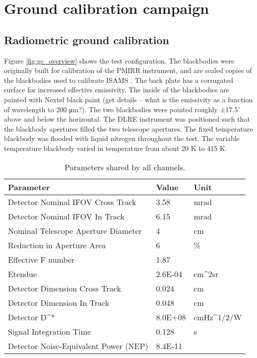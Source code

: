 \section{Ground calibration campaign}

\subsection{Radiometric ground calibration}
Figure \ref{fig:gc_overview} shows the test configuration.  The blackbodies were originally built for calibration of the PMIRR instrument, and are scaled copies of the blackbodies used to calibrate ISAMS \cite{Nightingale_1991}. The back plate has a corrugated surface for increased effective emissivity. The inside of the blackbodies are painted with Nextel black paint (get details – what is the emissivity as a function of wavelength to 200 μm?). The two blackbodies were pointed roughly ±17.5$^\circ$ above and below the horizontal.  The DLRE instrument was positioned such that the blackbody apertures filled the two telescope apertures.  The fixed temperature blackbody was flooded with liquid nitrogen throughout the test.  The variable temperature blackbody varied in temperature from about 20 K to 415 K.
\begin{table}
\begin{tabular}{lll}
Parameter & Value & Unit\\
\hline
Detector Nominal IFOV Cross Track & 3.58 & mrad \\
Detector Nominal IFOV In Track & 6.15 & mrad \\
Nominal Telescope Aperture Diameter & 4 & cm\\
Reduction in Aperture Area & 6 & \% \\
Effective F number & 1.87 & \\
Etendue & 2.6E-04 & cm^{2}sr \\
Detector Dimension Cross Track & 0.024 & cm \\
Detector Dimension In Track & 0.048 & cm \\
Detector D^* & 8.0E+08 & cmHz^{1/2}/W \\
Signal Integration Time & 0.128 & s \\
Detector Noise-Equivalent Power (NEP) & 8.4E-11 & \\
\hline
\end{tabular}
\caption{\label{tab:parameters_shared} Parameters shared by all channels.}
\end{table}

